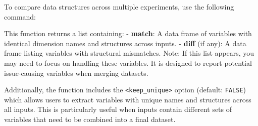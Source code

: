 \documentclass[
]{article}
\newenvironment{Shaded}{\begin{snugshade}}{\end{snugshade}}
\newcommand{\AttributeTok}[1]{\textcolor[rgb]{0.13,0.29,0.53}{#1}}
\newcommand{\CommentTok}[1]{\textcolor[rgb]{0.56,0.35,0.01}{\textit{#1}}}
\newcommand{\DecValTok}[1]{\textcolor[rgb]{0.00,0.00,0.81}{#1}}
\newcommand{\FunctionTok}[1]{\textcolor[rgb]{0.13,0.29,0.53}{\textbf{#1}}}
\newcommand{\NormalTok}[1]{#1}
\newcommand{\OtherTok}[1]{\textcolor[rgb]{0.56,0.35,0.01}{#1}}
\newcommand{\SpecialCharTok}[1]{\textcolor[rgb]{0.81,0.36,0.00}{\textbf{#1}}}
\newcommand{\StringTok}[1]{\textcolor[rgb]{0.31,0.60,0.02}{#1}}
\begin{document}
To compare data structures across multiple experiments, use the
following command:

\begin{Shaded}
\end{Shaded}

This function returns a list containing: - \textbf{match}: A data frame
of variables with identical dimension names and structures across
inputs. - \textbf{diff} (if any): A data frame listing variables with
structural mismatches. Note: If this list appears, you may need to focus
on handling these variables. It is designed to report potential
issue-causing variables when merging datasets.

Additionally, the function includes the
\texttt{\textless{}keep\_unique\textgreater{}} option (default:
\texttt{FALSE}) which allows users to extract variables with unique
names and structures across all inputs. This is particularly useful when
inputs contain different sets of variables that need to be combined into
a final dataset.
\end{document}

